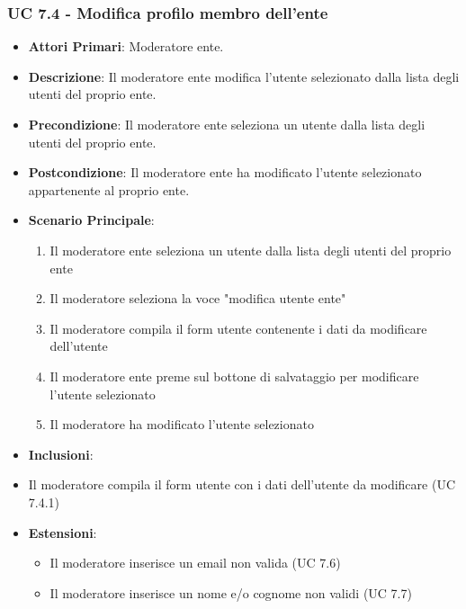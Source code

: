 			\subsubsection{UC 7.4 - Modifica profilo membro dell'ente}
			\begin{itemize}
				\item \textbf{Attori Primari}: Moderatore ente.
				\item \textbf{Descrizione}: Il moderatore ente modifica l'utente selezionato dalla lista degli utenti del proprio ente.
				\item \textbf{Precondizione}: Il moderatore ente seleziona un utente dalla lista degli utenti del proprio ente.
				\item \textbf{Postcondizione}: Il moderatore ente ha modificato l'utente selezionato appartenente al proprio ente.
				\item \textbf{Scenario Principale}:
				\begin{enumerate}
					\item{Il moderatore ente seleziona un utente dalla lista degli utenti del proprio ente}
					\item{Il moderatore seleziona la voce "modifica utente ente"}
					\item{Il moderatore compila il form utente contenente i dati da modificare dell'utente}
					\item{Il moderatore ente preme sul bottone di salvataggio per modificare l'utente selezionato}
					\item{Il moderatore ha modificato l'utente selezionato}
				\end{enumerate}	
				\item \textbf{Inclusioni}:
					\item Il moderatore compila il form utente con i dati dell'utente da modificare (UC 7.4.1)
				\item \textbf{Estensioni}:
				\begin{itemize}
					\item Il moderatore inserisce un email non valida (UC 7.6)
					\item Il moderatore inserisce un nome e/o cognome non validi (UC 7.7)
				\end{itemize}
			\end{itemize}

